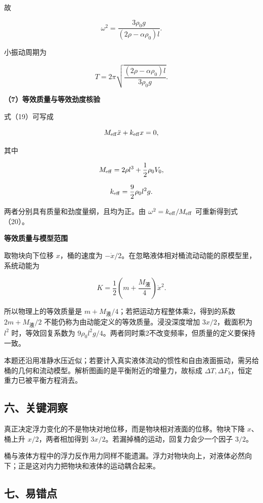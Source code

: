 \documentclass[12pt,a4paper,UTF8]{ctexart}
\begin{document}
故

\[
\boxed{
\omega^2
=\frac{3\rho_0g}
{(2\rho-\alpha\rho_0)l}
}.
\tag{22}
\]

小振动周期为

\[
\boxed{
T=2\pi
\sqrt{
\frac{(2\rho-\alpha\rho_0)l}
{3\rho_0g}
}
}.
\tag{23}
\]

\textbf{（7）等效质量与等效劲度核验}

式（19）可写成

\[
M_{\rm eff}\ddot x+k_{\rm eff}x=0,
\]

其中

\[
M_{\rm eff}
=2\rho l^3+\frac12\rho_0V_0,
\]

\[
k_{\rm eff}=\frac92\rho_0l^2g.
\]

两者分别具有质量和劲度量纲，且均为正。由
\(\omega^2=k_{\rm eff}/M_{\rm eff}\) 可重新得到式（20）。

\textbf{等效质量与模型范围}

取物块向下位移 \(x\)，桶的速度为
\(-\dot x/2\)。在忽略液体相对桶流动动能的原模型里，系统动能为

\[K=\frac12\left(m+\frac{M_{\text{液}}}4\right)\dot x^2.\]

所以物理上的等效质量是
\(m+M_{\text{液}}/4\)；若把运动方程整体乘2，得到的系数
\(2m+M_{\text{液}}/2\) 不能仍称为由动能定义的等效质量。浸没深度增加
\(3x/2\)，截面积为 \(l^2\) 时，等效回复系数为
\(9\rho_0l^2g/4\)。两者同时乘2不改变频率，但质量的定义要保持一致。

本题还沿用准静水压近似；若要计入真实液体流动的惯性和自由液面振动，需另给桶的几何和流动模型。解析图画的是平衡附近的增量力，故标成
\(\Delta T,\Delta F_b\)，恒定重力已被平衡方程消去。

\subsection{六、关键洞察}\label{ux516dux5173ux952eux6d1eux5bdf}

真正决定浮力变化的不是物块对地位移，而是物块相对液面的位移。物块下降
\(x\)、桶上升 \(x/2\)，两者相加得到
\(3x/2\)。若漏掉桶的运动，回复力会少一个因子 \(3/2\)。

桶与液体方程中的浮力反作用力同样不能遗漏。浮力对物块向上，对液体必然向下；正是这对内力把物块和液体的运动耦合起来。

\subsection{七、易错点}\label{ux4e03ux6613ux9519ux70b9}
\end{document}
